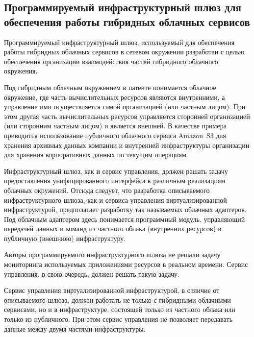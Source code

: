 \subsection{Программируемый инфраструктурный шлюз для обеспечения работы гибридных облачных сервисов}
Программируемый инфраструктурный шлюз, используемый для обеспечения работы гибридных облачных сервисов в сетевом окружении\cite{programmable-infrastructure-gateway} разработан с целью обеспечения организации взаимодействия частей гибридного облачного окружения.

Под гибридным облачным окружением в патенте понимается облачное окружение, где часть вычислительных ресурсов являются внутренними, а управление ими осуществляется самой организацией (или частным лицом). 
При этом другая часть вычислительных ресурсов управляется сторонней организацией (или сторонним частным лицом) и является внешней. 
В качестве примера приводится использование публичного облачного сервиса Amazon~S3\textsuperscript{\texttrademark} для хранения архивных данных компании и внутренней инфраструктуры организации для хранения корпоративных данных по текущим операциям.

Инфраструктурный шлюз, как и сервис управления, должен решать задачу предоставления унифицированного интерфейса к различным реализациям облачных окружений. 
Отсюда следует, что разработка описываемого инфраструктурного шлюза, как и сервиса управления виртуализированной инфраструктурой, предполагает разработку так называемых облачных адаптеров. 
Под облачным адаптером здесь понимается программный модуль, управляющий передачей данных и команд из частного облака (внутренних ресурсов) в  публичную (внешнюю) инфраструктуру.

Авторы программируемого инфраструктурного шлюза не решали задачу мониторинга используемых приложениями ресурсов в реальном времени. 
Сервис управления, в свою очередь, должен решать такую задачу.

Сервис управления виртуализированной инфраструктурой, в отличие от описываемого шлюза, должен работать не только с гибридными облачными сервисами, но и в инфраструктуре, состоящей только из частного облака или только из публичного.
При этом сервис управления не позволяет передавать данные между двумя частями инфраструктуры.
